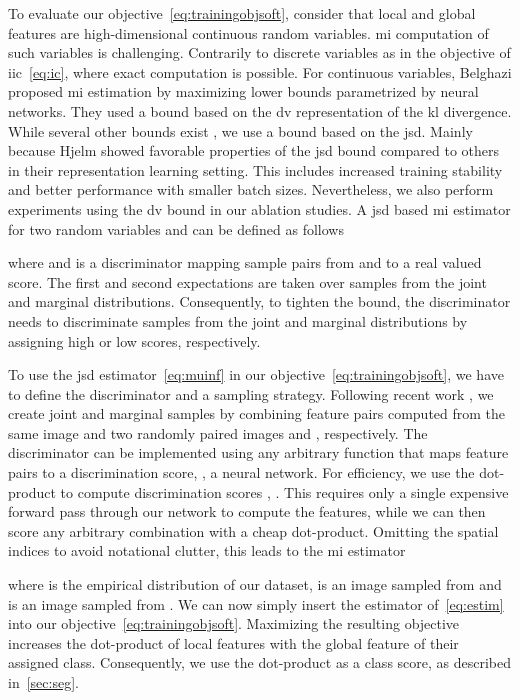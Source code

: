 To evaluate our objective~\cref{eq:trainingobjsoft}, consider that local and global features are high-dimensional continuous random variables.
\Gls{mi} computation of such variables is challenging.
Contrarily to discrete variables as in the objective of \gls{iic}~\cref{eq:ic}, where exact computation is possible.
For continuous variables, Belghazi \etal \cite{mine} proposed \gls{mi} estimation by maximizing lower bounds parametrized by neural networks.
They used a bound based on the \gls{dv} representation of the \gls{kl} divergence.
While several other bounds exist \cite{varbounds}, we use a bound based on the \gls{jsd}.
Mainly because Hjelm \etal \cite{deepinfo} showed favorable properties of the \gls{jsd} bound compared to others in their representation learning setting.
This includes increased training stability and better performance with smaller batch sizes.
Nevertheless, we also perform experiments using the \gls{dv} bound in our ablation studies.
A \gls{jsd} based \gls{mi} estimator  for two random variables  and  can be defined as follows \cite{nowozin2016f}

where  and  is a discriminator mapping sample pairs from  and  to a real valued score.
The first and second expectations are taken over samples from the joint  and marginal  distributions.
Consequently, to tighten the bound, the discriminator  needs to discriminate samples from the joint and marginal distributions by assigning high or low scores, respectively.

To use the \gls{jsd} estimator~\cref{eq:muinf} in our objective~\cref{eq:trainingobjsoft}, we have to define the discriminator  and a sampling strategy.
Following recent work \cite{deepinfo,bachman19}, we create joint and marginal samples by combining feature pairs computed from the same image  and two randomly paired images  and , respectively.
The discriminator  can be implemented using any arbitrary function that maps feature pairs to a discrimination score, \eg, a neural network.
For efficiency, we use the dot-product to compute discrimination scores \ie, .
This requires only a single expensive forward pass through our network to compute the features, while we can then score any arbitrary combination with a cheap dot-product.
Omitting the spatial indices  to avoid notational clutter, this leads to the \gls{mi} estimator

where  is the empirical distribution of our dataset,  is an image sampled from  and  is an image sampled from .
We can now simply insert the estimator of~\cref{eq:estim} into our objective~\cref{eq:trainingobjsoft}.
Maximizing the resulting objective increases the dot-product of local features with the global feature of their assigned class.
Consequently, we use the dot-product as a class score, as described in~\cref{sec:seg}.

